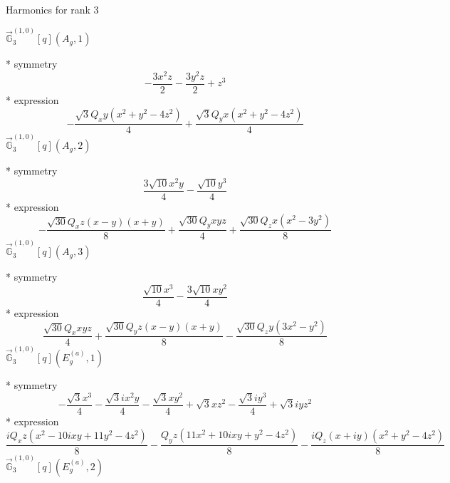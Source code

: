 \documentclass[fleqn,8pt]{jsarticle}
\begin{document}
\noindent * Harmonics for rank 3

\noindent\quad $\vec{\mathbb{G}}_{3}^{(1,0)}[q](A_{g},1)$

\noindent\quad ** symmetry
\begin{dmath*}
- \frac{3 x^{2} z}{2} - \frac{3 y^{2} z}{2} + z^{3}
\end{dmath*}
\noindent\quad ** expression
\begin{dmath*}
- \frac{\sqrt{3} Q_{x} y \left(x^{2} + y^{2} - 4 z^{2}\right)}{4} + \frac{\sqrt{3} Q_{y} x \left(x^{2} + y^{2} - 4 z^{2}\right)}{4}
\end{dmath*}
\noindent\quad $\vec{\mathbb{G}}_{3}^{(1,0)}[q](A_{g},2)$

\noindent\quad ** symmetry
\begin{dmath*}
\frac{3 \sqrt{10} x^{2} y}{4} - \frac{\sqrt{10} y^{3}}{4}
\end{dmath*}
\noindent\quad ** expression
\begin{dmath*}
- \frac{\sqrt{30} Q_{x} z \left(x - y\right) \left(x + y\right)}{8} + \frac{\sqrt{30} Q_{y} x y z}{4} + \frac{\sqrt{30} Q_{z} x \left(x^{2} - 3 y^{2}\right)}{8}
\end{dmath*}
\noindent\quad $\vec{\mathbb{G}}_{3}^{(1,0)}[q](A_{g},3)$

\noindent\quad ** symmetry
\begin{dmath*}
\frac{\sqrt{10} x^{3}}{4} - \frac{3 \sqrt{10} x y^{2}}{4}
\end{dmath*}
\noindent\quad ** expression
\begin{dmath*}
\frac{\sqrt{30} Q_{x} x y z}{4} + \frac{\sqrt{30} Q_{y} z \left(x - y\right) \left(x + y\right)}{8} - \frac{\sqrt{30} Q_{z} y \left(3 x^{2} - y^{2}\right)}{8}
\end{dmath*}
\noindent\quad $\vec{\mathbb{G}}_{3}^{(1,0)}[q](E_{g}^{(a)},1)$

\noindent\quad ** symmetry
\begin{dmath*}
- \frac{\sqrt{3} x^{3}}{4} - \frac{\sqrt{3} i x^{2} y}{4} - \frac{\sqrt{3} x y^{2}}{4} + \sqrt{3} x z^{2} - \frac{\sqrt{3} i y^{3}}{4} + \sqrt{3} i y z^{2}
\end{dmath*}
\noindent\quad ** expression
\begin{dmath*}
\frac{i Q_{x} z \left(x^{2} - 10 i x y + 11 y^{2} - 4 z^{2}\right)}{8} - \frac{Q_{y} z \left(11 x^{2} + 10 i x y + y^{2} - 4 z^{2}\right)}{8} - \frac{i Q_{z} \left(x + i y\right) \left(x^{2} + y^{2} - 4 z^{2}\right)}{8}
\end{dmath*}
\noindent\quad $\vec{\mathbb{G}}_{3}^{(1,0)}[q](E_{g}^{(a)},2)$
\end{document}
